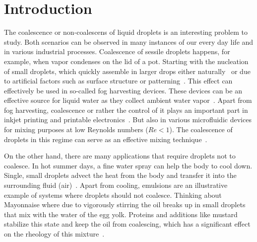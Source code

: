 \documentclass[twocolumn,amsmath,amssymb,showpacs,pre,nofootinbib,superscriptaddress]{revtex4-1} %
\begin{document}
\maketitle

\newcommand{\ts}{\textsuperscript}

\section{Introduction}\label{sec:intro}
The coalescence or non-coalescens of liquid droplets is an interesting problem to study. 
Both scenarios can be observed in many instances of our every day life and in various industrial processes.
Coalescence of sessile droplets happens, for example, when vapor condenses on the lid of a pot.
Starting with the nucleation of small droplets, which quickly assemble in larger drops either naturally~\cite{PhysRevA.43.1906} or due to artificial factors such as surface structure or patterning~\cite{C1SM06219K}. 
This effect can effectively be used in so-called fog harvesting devices. 
These devices can be an effective source for liquid water as they collect ambient water vapor~\cite{zhang2015inkjet, shi2018fog}.
Apart from fog harvesting, coalescence or rather the control of it plays an important part in inkjet printing and printable electronics~\cite{jo2009evaluation, singh2010inkjet, Kim_2005, Luechinger_2008}.
But also in various microfluidic devices for mixing purposes at low Reynolds numbers ($Re < 1$). 
The coalescence of droplets in this regime can serve as an effective mixing technique~\cite{https://doi.org/10.1002/pen.760352206, doi:10.1063/1.858199}. 

On the other hand, there are many applications that require droplets not to coalesce.
In hot summer days, a fine water spray can help the body to cool down.
Single, small droplets advect the heat from the body and transfer it into the surrounding fluid (air)~\cite{kim2007spray}.
Apart from cooling, emulsions are an illustrative example of systems where droplets should not coalesce.
Thinking about Mayonnaise where due to vigorously stirring the oil breaks up in small droplets that mix with the water of the egg yolk.
Proteins and additions like mustard stabilize this state and keep the oil from coalescing, which has a significant effect on the rheology of this mixture~\cite{harrison1985factors, DEPREE2001157}.
\end{document}

